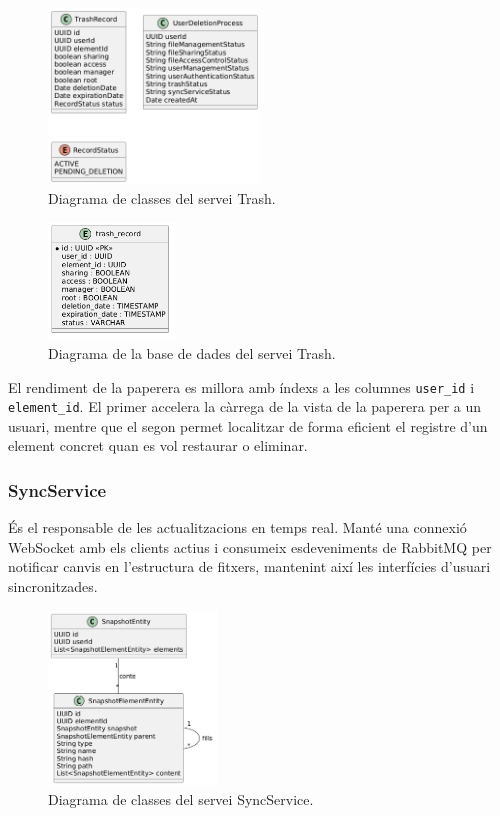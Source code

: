 \begin{figure}[H]
    \centering
    \includegraphics[width=0.5\textwidth]{Figures/diagrama_clases_Trash.png}
    \caption{Diagrama de classes del servei Trash.}
    \label{fig:trash_classes}
\end{figure}

\begin{figure}[H]
    \centering
    \includegraphics[width=0.3\textwidth]{Figures/diagrama_bd_trash.png}
    \caption{Diagrama de la base de dades del servei Trash.}
    \label{fig:trash_db}
\end{figure}

El rendiment de la paperera es millora amb índexs a les columnes \texttt{user\_id} i \texttt{element\_id}. El primer accelera la càrrega de la vista de la paperera per a un usuari, mentre que el segon permet localitzar de forma eficient el registre d'un element concret quan es vol restaurar o eliminar.

\subsubsection{SyncService}
És el responsable de les actualitzacions en temps real. Manté una connexió WebSocket amb els clients actius i consumeix esdeveniments de RabbitMQ per notificar canvis en l'estructura de fitxers, mantenint així les interfícies d'usuari sincronitzades.

\begin{figure}[H]
    \centering
    \includegraphics[width=0.4\textwidth]{Figures/diagrama_clases_sync.png}
    \caption{Diagrama de classes del servei SyncService.}
    \label{fig:sync_classes}
\end{figure}

